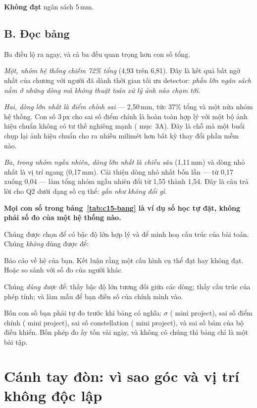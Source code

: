 \documentclass[../../marker.tex]{subfiles}
\begin{document}
\textbf{Không đạt} ngân sách 5\,mm.

\subsection{B. Đọc bảng}

Ba điều lộ ra ngay, và cả ba đều quan trọng hơn con số tổng.

\emph{Một, nhóm hệ thống chiếm 72\% tổng} (4,93 trên 6,81). Đây là kết quả bất ngờ nhất của chương với người đã dành thời gian tối ưu detector: \emph{phần lớn ngân sách nằm ở những dòng mà không thuật toán xử lý ảnh nào chạm tới}.

\emph{Hai, dòng lớn nhất là điểm chính sai} --- 2,50\,mm, tức 37\% tổng và một nửa nhóm hệ thống. Con số 3\,px cho sai số điểm chính là hoàn toàn hợp lý với một bộ ảnh hiệu chuẩn không có tư thế nghiêng mạnh ( mục~3A). Đây là chỗ mà một buổi chụp lại ảnh hiệu chuẩn cho ra nhiều milimét hơn bất kỳ thay đổi phần mềm nào.

\emph{Ba, trong nhóm ngẫu nhiên, dòng lớn nhất là chiều sâu} (1,11\,mm) và dòng nhỏ nhất là vị trí ngang (0,17\,mm). Cải thiện dòng nhỏ nhất bốn lần --- từ 0,17 xuống 0,04 --- làm tổng nhóm ngẫu nhiên đổi từ 1,55 thành 1,54. Đây là câu trả lời cho Q2 dưới dạng số cụ thể: \emph{gần như không đổi gì}.

\begin{cambay}
\textbf{Mọi con số trong bảng~\ref{tab:c15-bang} là ví dụ số học tự đặt, không phải số đo của một hệ thống nào.}

Chúng được chọn để có bậc độ lớn hợp lý và để minh hoạ cấu trúc của bài toán. Chúng \emph{không} dùng được để:

Báo cáo về hệ của bạn. Kết luận rằng một cấu hình cụ thể đạt hay không đạt. Hoặc so sánh với số đo của người khác.

Chúng \emph{dùng được} để: thấy bậc độ lớn tương đối giữa các dòng; thấy cấu trúc của phép tính; và làm mẫu để bạn điền số của chính mình vào.

Bốn con số bạn phải tự đo trước khi bảng có nghĩa: \(\sigma\) ( mini project), sai số điểm chính ( mini project), sai số constellation ( mini project), và sai số bám của bộ điều khiển. Bốn phép đo ấy tốn vài ngày, và không có chúng thì bảng chỉ là một bài tập.
\end{cambay}

\section{Cánh tay đòn: vì sao góc và vị trí không độc lập}
\end{document}
